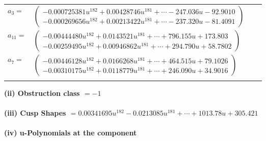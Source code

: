 \documentclass[1p]{elsarticle_modified}
\theoremstyle{definition}
\begin{document}
\begin{tabular}{m{7pt} m{180pt} m{7pt} m{180pt} }
\flushright $a_{3}=$&$\begin{pmatrix}-0.000725381 u^{182}+0.00428746 u^{181}+\cdots-247.036 u-92.9010\\-0.000269656 u^{182}+0.00213422 u^{181}+\cdots-237.320 u-81.4091\end{pmatrix}$ \\
\flushright $a_{11}=$&$\begin{pmatrix}-0.00444480 u^{182}+0.0143521 u^{181}+\cdots+796.155 u+173.803\\-0.00259495 u^{182}+0.00946862 u^{181}+\cdots+294.790 u+58.7802\end{pmatrix}$ \\
\flushright $a_{7}=$&$\begin{pmatrix}-0.00446128 u^{182}+0.0166268 u^{181}+\cdots+464.515 u+79.1026\\-0.00310175 u^{182}+0.0118779 u^{181}+\cdots+246.090 u+34.9016\end{pmatrix}$\\&\end{tabular}
\flushleft \textbf{(ii) Obstruction class $= -1$}\\~\\
\flushleft \textbf{(iii) Cusp Shapes $= 0.00341695 u^{182}-0.0213085 u^{181}+\cdots+1013.78 u+305.421$}\\~\\
\newpage\renewcommand{\arraystretch}{1}
\flushleft \textbf{(iv) u-Polynomials at the component}\newline \\
\end{document}
